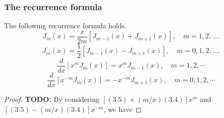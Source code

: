 \subsubsection{The recurrence formula}
\begin{proposition}[]
The following recurrence formula holds.
\begin{equation}\label{eq.Bessel_recursion_1}
    J_m(x)=\frac{x}{2 m}\left[J_{m-1}(x)+J_{m+1}(x)\right], \quad m=1,2, \ldots .
\end{equation}
\begin{equation}\label{eq.Bessel_recursion_2}
    J_m^{\prime}(x)=\frac{1}{2}\left[J_{m-1}(x)-J_{m+1}(x)\right], \quad m=0,1,2, \ldots .
\end{equation}
\begin{equation}\label{eq.Bessel_recursion_3}
    \frac{d}{d x}\left[x^m J_m(x)\right]=x^m J_{m-1}(x), \quad m=1,2, \cdots
\end{equation}
\begin{equation}\label{eq.Bessel_recursion_4}
    \frac{d}{d x}\left[x^{-m} J_m(x)\right]=-x^{-m} J_{m+1}(x), \quad m=0,1,2, \cdots
\end{equation}
\end{proposition}
\begin{proof}
    \textbf{TODO: } By considering $[(3.5)+(m / x)(3.4)] x^m$ and $[(3.5)-(m / x)(3.4)] x^{-m}$, we have
\end{proof}

